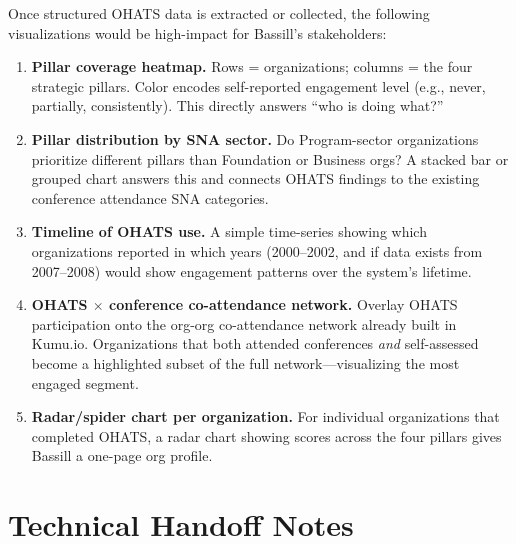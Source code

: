 \documentclass[12pt]{article}
\begin{document}
Once structured OHATS data is extracted or collected, the following
visualizations would be high-impact for Bassill's stakeholders:

\begin{enumerate}[leftmargin=1.5em]
  \item \textbf{Pillar coverage heatmap.}
        Rows = organizations; columns = the four strategic pillars.
        Color encodes self-reported engagement level (e.g., never, partially,
        consistently). This directly answers ``who is doing what?''

  \item \textbf{Pillar distribution by SNA sector.}
        Do Program-sector organizations prioritize different pillars than
        Foundation or Business orgs? A stacked bar or grouped chart
        answers this and connects OHATS findings to the existing conference
        attendance SNA categories.

  \item \textbf{Timeline of OHATS use.}
        A simple time-series showing which organizations reported in which
        years (2000--2002, and if data exists from 2007--2008) would
        show engagement patterns over the system's lifetime.

  \item \textbf{OHATS $\times$ conference co-attendance network.}
        Overlay OHATS participation onto the org-org co-attendance network
        already built in Kumu.io. Organizations that both attended conferences
        \emph{and} self-assessed become a highlighted subset of the full
        network---visualizing the most engaged segment.

  \item \textbf{Radar/spider chart per organization.}
        For individual organizations that completed OHATS, a radar chart
        showing scores across the four pillars gives Bassill a one-page
        org profile.
\end{enumerate}

\section{Technical Handoff Notes}
\end{document}
